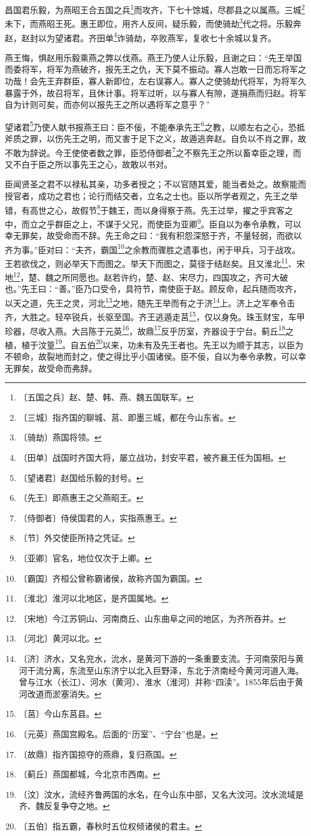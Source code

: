 \documentclass[12pt,UTF-8,openany]{ctexbook}
\begin{document}
\begin{normalsize}
    
    昌国君乐毅，为燕昭王合五国之兵\footnote{〔五国之兵〕赵、楚、韩、燕、魏五国联军。}而攻齐，下七十馀城，尽郡县之以属燕。三城\footnote{〔三城〕指齐国的聊城、莒、即墨三城，都在今山东省。}未下，而燕昭王死。惠王即位，用齐人反间，疑乐毅，而使骑劫\footnote{〔骑劫〕燕国将领。}代之将。乐毅奔赵，赵封以为望诸君。齐田单\footnote{〔田单〕战国时齐国大将，屡立战功，封安平君，被齐襄王任为国相。}诈骑劫，卒败燕军，复收七十余城以复齐。
    
    燕王悔，惧赵用乐毅乘燕之弊以伐燕。燕王乃使人让乐毅，且谢之曰：“先王举国而委将军，将军为燕破齐，报先王之仇，天下莫不振动。寡人岂敢一日而忘将军之功哉！会先王弃群臣，寡人新即位，左右误寡人。寡人之使骑劫代将军，为将军久暴露于外，故召将军，且休计事。将军过听，以与寡人有隙，遂捐燕而归赵。将军自为计则可矣，而亦何以报先王之所以遇将军之意乎？”
    
    望诸君\footnote{〔望诸君〕赵国给乐毅的封号。}乃使人献书报燕王曰：臣不佞，不能奉承先王\footnote{〔先王〕即燕惠王之父燕昭王。}之教，以顺左右之心，恐抵斧质之罪，以伤先王之明，而又害于足下之义，故遁逃奔赵。自负以不肖之罪，故不敢为辞说。今王使使者数之罪，臣恐侍御者\footnote{〔侍御者〕侍侯国君的人，实指燕惠王。}之不察先王之所以畜幸臣之理，而又不白于臣之所以事先王之心，故敢以书对。
    
    臣闻贤圣之君不以禄私其亲，功多者授之；不以官随其爱，能当者处之。故察能而授官者，成功之君也；论行而结交者，立名之士也。臣以所学者观之，先王之举错，有高世之心，故假节\footnote{〔节〕外交使臣所持之凭证。}于魏王，而以身得察于燕。先王过举，擢之乎宾客之中，而立之乎群臣之上，不谋于父兄，而使臣为亚卿\footnote{〔亚卿〕官名，地位仅次于上卿。}。臣自以为奉令承教，可以幸无罪矣，故受命而不辞。先王命之曰：“我有积怨深怒于齐，不量轻弱，而欲以齐为事。”臣对曰：“夫齐，霸国\footnote{〔霸国〕齐桓公曾称霸诸侯，故称齐国为霸国。}之余教而骤胜之遗事也，闲于甲兵，习于战攻。王若欲伐之，则必举天下而图之。举天下而图之，莫径于结赵矣。且又淮北\footnote{〔淮北〕淮河以北地区，是齐国属地。}、宋地\footnote{〔宋地〕今江苏铜山、河南商丘、山东曲阜之间的地区，为齐所吞并。}，楚、魏之所同愿也。赵若许约，楚、赵、宋尽力，四国攻之，齐可大破也。”先王曰：“善。”臣乃口受令，具符节，南使臣于赵。顾反命，起兵随而攻齐，以天之道，先王之灵，河北\footnote{〔河北〕黄河以北。}之地，随先王举而有之于济\footnote{〔济〕济水，又名兖水，沇水，是黄河下游的一条重要支流。于河南荥阳与黄河干流分离，东流至山东济宁以北入巨野泽，东北于济南经今黄河河道入海。曾与江水（长江）、河水（黄河）、淮水（淮河）并称“四渎”。1855年后由于黄河改道而淤塞消失。}上。济上之军奉令击齐，大胜之。轻卒锐兵，长驱至国。齐王逃遁走莒\footnote{〔莒〕今山东莒县。}，仅以身免。珠玉财宝，车甲珍器，尽收入燕。大吕陈于元英\footnote{〔元英〕燕国宫殿名。后面的“历室”、“宁台”也是。}，故鼎\footnote{〔故鼎〕指齐国掠夺的燕鼎，复归燕国。}反乎历室，齐器设于宁台。蓟丘\footnote{〔蓟丘〕燕国都城，今北京市西南。}之植，植于汶篁\footnote{〔汶〕汶水，流经齐鲁两国的水名，在今山东中部，又名大汶河。汶水流域是齐、魏反复争夺之地。}。自五伯\footnote{〔五伯〕指五霸，春秋时五位权倾诸侯的君主。}以来，功未有及先王者也。先王以为顺于其志，以臣为不顿命，故裂地而封之，使之得比乎小国诸侯。臣不佞，自以为奉令承教，可以幸无罪矣，故受命而弗辞。
    

\end{normalsize}
\end{document}
